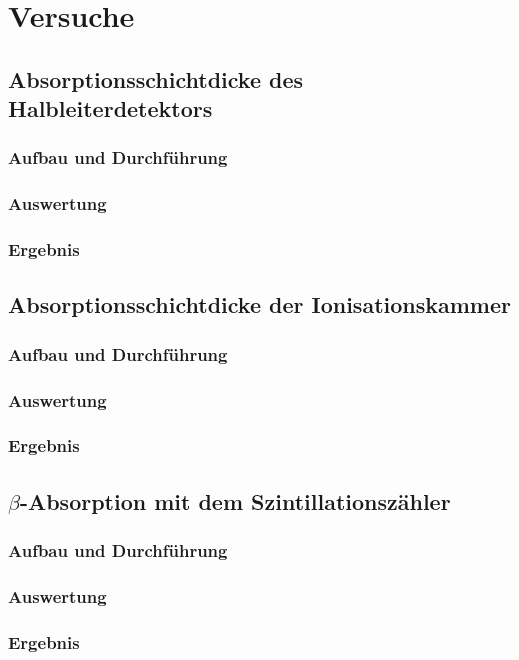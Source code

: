 \documentclass{../Misc/MontavonLaTeX/Montavon}
\begin{document}
\section{Versuche}
\subsection{Absorptionsschichtdicke des Halbleiterdetektors}
\subsubsection{Aufbau und Durchführung}
\subsubsection{Auswertung}
\subsubsection{Ergebnis}

\subsection{Absorptionsschichtdicke der Ionisationskammer}
\subsubsection{Aufbau und Durchführung}
\subsubsection{Auswertung}
\subsubsection{Ergebnis}

\subsection{$\beta$-Absorption mit dem Szintillationszähler}
\subsubsection{Aufbau und Durchführung}
\subsubsection{Auswertung}
\subsubsection{Ergebnis}
\end{document}
